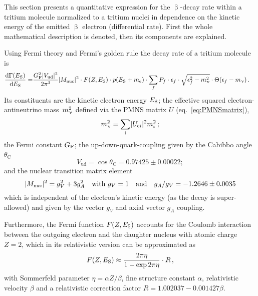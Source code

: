 This section presents a quantitative expression for the $\upbeta$-decay rate within a tritium molecule normalized to a tritium nuclei in dependence on the kinetic energy of the emitted $\upbeta$ electron (differential rate). First the whole mathematical description is denoted, then its components are explained.

Using Fermi theory and Fermi's golden rule the decay rate of a tritium molecule is~\cite{Kleesiek2019,Otten:2008zz} 
\begin{align}
\label{eq:intSpecModelDiffSpec}
\frac{\mathop{}\!\mathrm{d}\Gamma(E_\mathrm{S})}{\mathop{}\!\mathrm{d} E_\mathrm{S}} = &
\frac{G_\mathrm{F}^2 \lvert V_\mathrm{ud}\rvert^2}{2 \pi^3}
\lvert M_\mathrm{nuc}\rvert^2 \cdot
F(Z, E_\mathrm{S}) \cdot 
p(E_\mathrm{S}+m_{\mathrm{e}}) \cdot 
\sum_{f} 
	P_f \cdot 
	\epsilon_f \cdot 
	\sqrt{\epsilon_f^2-m_\upnu^2} \cdot 
	\Theta(\epsilon_f-m_\upnu)
	\text{\,.}
\end{align}
Its constituents are the kinetic electron energy $E_\mathrm{S}$;
the effective squared electron-antineutrino mass~$m_\upnu^2$ defined via the PMNS matrix $U$ (eq.~\ref{eq:PMNSmatrix}),
\begin{equation}
	 m_\upnu^2 = \sum_{i}\lvert U_{\mathrm{e} i}\rvert^2 m_i^2\,;
\end{equation}
the Fermi constant $G_\mathrm{F}$;
the up-down-quark-coupling given by the Cabibbo angle $\theta_\mathrm{C}$~\cite{ReviewOfParticlePhysics}
\begin{equation}
V_\mathrm{ud} = \cos \theta_\mathrm{C} = 
0.97425\pm0.00022;
\end{equation}
and the nuclear transition matrix element~\cite{ReviewOfParticlePhysics}
\begin{equation}
\lvert M_\mathrm{nuc}\rvert^2 = g_V^2+3g_A^2 \quad
\text{with } g_V = 1 \quad
\text{and} \quad g_A/g_V = -1.2646 \pm 0.0035
\end{equation}
which is independent of the electron's kinetic energy (as the decay is super-allowed) and given by the vector $g_V$ and axial vector $g_A$ coupling.

Furthermore, the Fermi function $F(Z,E_\mathrm{S})$ accounts for the Coulomb interaction between the outgoing electron and the daughter nucleus with atomic charge $Z=2$, which in its relativistic version can be approximated as~\cite{Simpson1981}
\begin{equation}
F(Z,E_\mathrm{S}) \approx \frac{2 \pi \eta}{1-\exp{2 \pi \eta}} \cdot R
\text{\,,}
\end{equation}
with Sommerfeld parameter $\eta = \alpha Z / \beta$, fine structure constant $\alpha$, relativistic velocity $\beta$ and a relativistic correction factor $R = 1.002037-0.001427\beta$.

